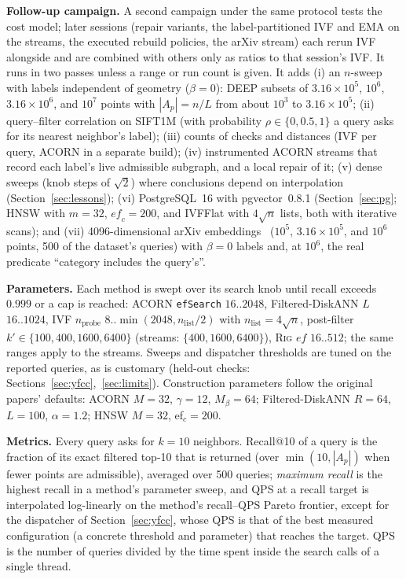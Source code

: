 \documentclass[conference]{IEEEtran}
\newcommand{\rig}{\textsc{Rig}}
\begin{document}
\textbf{Follow-up campaign.} A second campaign under the same protocol tests the cost model; later sessions (repair variants, the label-partitioned IVF and EMA on the streams, the executed rebuild policies, the arXiv stream) each rerun IVF alongside and are combined with others only as ratios to that session's IVF. It runs in two passes unless a range or run count is given. It adds (i) an $n$-sweep with labels independent of geometry ($\beta{=}0$): DEEP subsets of $3.16\times10^5$, $10^6$, $3.16\times10^6$, and $10^7$ points with $|A_p|=n/L$ from about $10^3$ to $3.16\times10^5$; (ii) query--filter correlation on SIFT1M (with probability $\rho\in\{0,0.5,1\}$ a query asks for its nearest neighbor's label); (iii) counts of checks and distances (IVF per query, ACORN in a separate build); (iv) instrumented ACORN streams that record each label's live admissible subgraph, and a local repair of it; (v) dense sweeps (knob steps of $\sqrt2$) where conclusions depend on interpolation (Section~\ref{sec:lessons}); (vi) PostgreSQL~16 with pgvector~0.8.1 (Section~\ref{sec:pg}; HNSW with $m{=}32$, $\mathit{ef}_c{=}200$, and IVFFlat with $4\sqrt n$ lists, both with iterative scans); and (vii) 4096-dimensional arXiv embeddings~\cite{iff2026fanns} ($10^5$, $3.16\times10^5$, and $10^6$ points, 500 of the dataset's queries) with $\beta{=}0$ labels and, at $10^6$, the real predicate ``category includes the query's''.

\textbf{Parameters.} Each method is swept over its search knob until recall exceeds $0.999$ or a cap is reached: ACORN \texttt{efSearch} $16..2048$, Filtered-DiskANN $L$ $16..1024$, IVF $n_{\text{probe}}$ $8..\min(2048,n_{\text{list}}/2)$ with $n_{\text{list}}=4\sqrt n$, post-filter $k'\in\{100,400,1600,6400\}$ (streams: $\{400,1600,6400\}$), \rig{} $\mathit{ef}$ $16..512$; the same ranges apply to the streams. Sweeps and dispatcher thresholds are tuned on the reported queries, as is customary (held-out checks: Sections~\ref{sec:yfcc},~\ref{sec:limits}). Construction parameters follow the original papers' defaults: ACORN $M{=}32$, $\gamma{=}12$, $M_\beta{=}64$; Filtered-DiskANN $R{=}64$, $L{=}100$, $\alpha{=}1.2$; HNSW $M{=}32$, ef$_c{=}200$.

\textbf{Metrics.} Every query asks for $k{=}10$ neighbors. Recall@10 of a query is the fraction of its exact filtered top-10 that is returned (over $\min(10,|A_p|)$ when fewer points are admissible), averaged over 500 queries; \emph{maximum recall} is the highest recall in a method's parameter sweep, and QPS at a recall target is interpolated log-linearly on the method's recall--QPS Pareto frontier, except for the dispatcher of Section~\ref{sec:yfcc}, whose QPS is that of the best measured configuration (a concrete threshold and parameter) that reaches the target. QPS is the number of queries divided by the time spent inside the search calls of a single thread.
\end{document}
